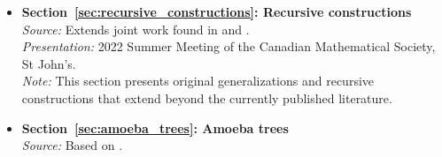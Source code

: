 \begin{publications}
\begin{itemize}
    \item \textbf{Section~\ref{sec:recursive_constructions}: Recursive constructions}
    \\ \textit{Source:} Extends joint work found in \cite{Eslavaetal2025} and \cite{Caroetal2023}.
    \\ \textit{Presentation:} 2022 Summer Meeting of the Canadian Mathematical Society, St John's.
    \\ \textit{Note:} This section presents original generalizations and recursive constructions that extend beyond the currently published literature.

    \item \textbf{Section~\ref{sec:amoeba_trees}: Amoeba trees}
    \\ \textit{Source:} Based on \cite{GomezetalPreprint}.
\end{itemize}
\end{publications}